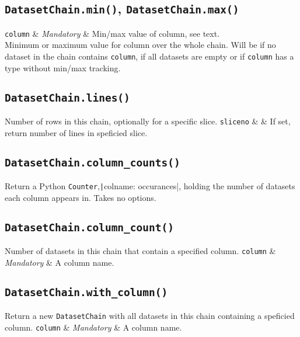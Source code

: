 \subsection{\texttt{DatasetChain.min()}, \texttt{DatasetChain.max()}}
\begin{leftbar}
\starttable
\texttt{column} & \textsl{Mandatory} & Min/max value of column, see text.\\
\stoptable
Minimum or maximum value for column over the whole chain.  Will be
\pyNone if no dataset in the chain contains \texttt{column}, if all datasets are
empty or if \texttt{column} has a type without min/max tracking.
\end{leftbar}


\subsection{\texttt{DatasetChain.lines()}}
\begin{leftbar}
Number of rows in this chain, optionally for a specific slice.
\starttable
\texttt{sliceno} & \pyNone & If set, return number of lines in speficied slice.\\
\stoptable
\end{leftbar}

\subsection{\texttt{DatasetChain.column\_counts()}}
\begin{leftbar}
Return a Python \texttt{Counter},\texttt|{colname:
occurances}|, holding the number of datasets each column appears in.
Takes no options.
\end{leftbar}

\subsection{\texttt{DatasetChain.column\_count()}}
\begin{leftbar}
Number of datasets in this chain that contain a specified column.
\starttable
\texttt{column} & \textsl{Mandatory} & A column name.\\
\stoptable
\end{leftbar}


\subsection{\texttt{DatasetChain.with\_column()}}
\begin{leftbar}
Return a new \texttt{DatasetChain} with all datasets in this chain
containing a speficied column.
\starttable
\texttt{column} & \textsl{Mandatory} & A column name.\\
\stoptable
\end{leftbar}


